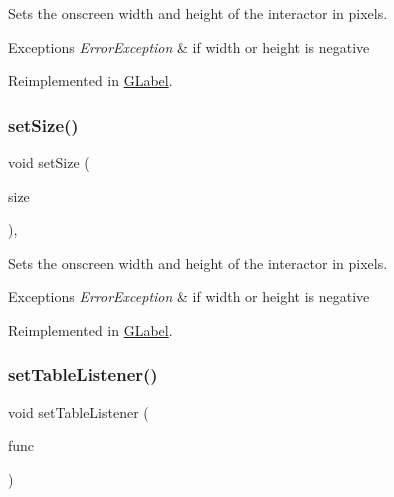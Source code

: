 Sets the onscreen width and height of the interactor in pixels. 


\begin{DoxyExceptions}{Exceptions}
{\em Error\+Exception} & if width or height is negative \\
\hline
\end{DoxyExceptions}


Reimplemented in \mbox{\hyperlink{classsgl_1_1GLabel_a8ba9af72c23f52d4b93096a13a11f150}{G\+Label}}.

\mbox{\label{classsgl_1_1GInteractor_ae2b628228f192c2702c4ce941b2af68f}} 
\subsubsection{\texorpdfstring{set\+Size()}{setSize()}\hspace{0.1cm}{\footnotesize\ttfamily [2/2]}}
{\footnotesize\ttfamily void set\+Size (\begin{DoxyParamCaption}\item[{const \mbox{\hyperlink{structsgl_1_1GDimension}{G\+Dimension}} \&}]{size }\end{DoxyParamCaption})\hspace{0.3cm}{\ttfamily [virtual]}, {\ttfamily [inherited]}}



Sets the onscreen width and height of the interactor in pixels. 


\begin{DoxyExceptions}{Exceptions}
{\em Error\+Exception} & if width or height is negative \\
\hline
\end{DoxyExceptions}


Reimplemented in \mbox{\hyperlink{classsgl_1_1GLabel_a42d96e60c62d7770993327d7147d77b8}{G\+Label}}.

\mbox{\label{classsgl_1_1GTable_aeeb00b5caf01028e9de6f2dd6ef4b9bd}} 
\subsubsection{\texorpdfstring{set\+Table\+Listener()}{setTableListener()}\hspace{0.1cm}{\footnotesize\ttfamily [1/2]}}
{\footnotesize\ttfamily void set\+Table\+Listener (\begin{DoxyParamCaption}\item[{\mbox{\hyperlink{namespacesgl_ae9f3e9eab70035da1a2b114e21357b25}{G\+Event\+Listener}}}]{func }\end{DoxyParamCaption})\hspace{0.3cm}{\ttfamily [virtual]}}



